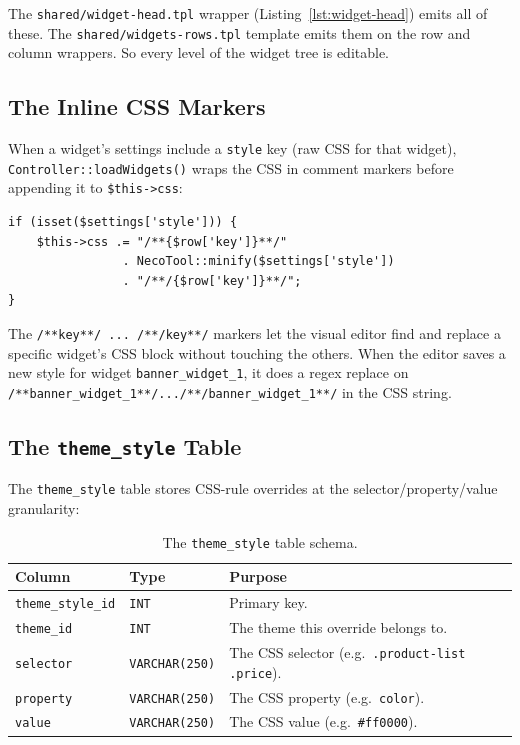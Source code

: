 \documentclass[11pt,a4paper]{article}
\begin{document}
The \texttt{shared/widget-head.tpl} wrapper (Listing~\ref{lst:widget-head})
emits all of these. The \texttt{shared/widgets-rows.tpl} template
emits them on the row and column wrappers. So every level of the
widget tree is editable.

\subsection{The Inline CSS Markers}

When a widget's settings include a \texttt{style} key (raw CSS for
that widget), \texttt{Controller::loadWidgets()} wraps the CSS in
comment markers before appending it to \texttt{\$this->css}:

\begin{lstlisting}[caption={The inline CSS markers (used by the visual editor).},label={lst:css-markers}]
if (isset($settings['style'])) {
    $this->css .= "/**{$row['key']}**/"
                . NecoTool::minify($settings['style'])
                . "/**/{$row['key']}**/";
}
\end{lstlisting}

The \texttt{/**key**/ ... /**/key**/} markers let the visual editor
find and replace a specific widget's CSS block without touching
the others. When the editor saves a new style for widget
\texttt{banner\_widget\_1}, it does a regex replace on
\texttt{/**banner\_widget\_1**/.../**/banner\_widget\_1**/} in the
CSS string.

\subsection{The \texttt{theme\_style} Table}

The \texttt{theme\_style} table stores CSS-rule overrides at the
selector/property/value granularity:

\begin{table}[htbp]
\centering
\caption{The \texttt{theme\_style} table schema.}\label{tab:theme-style}
\small
\begin{tabularx}{\columnwidth}{llX}
\toprule
\textbf{Column} & \textbf{Type} & \textbf{Purpose} \\
\midrule
\texttt{theme\_style\_id} & \texttt{INT} & Primary key. \\
\texttt{theme\_id}        & \texttt{INT} & The theme this override belongs to. \\
\texttt{selector}         & \texttt{VARCHAR(250)} & The CSS selector (e.g.\ \texttt{.product-list .price}). \\
\texttt{property}         & \texttt{VARCHAR(250)} & The CSS property (e.g.\ \texttt{color}). \\
\texttt{value}            & \texttt{VARCHAR(250)} & The CSS value (e.g.\ \texttt{\#ff0000}). \\
\bottomrule
\end{tabularx}
\end{table}
\end{document}
